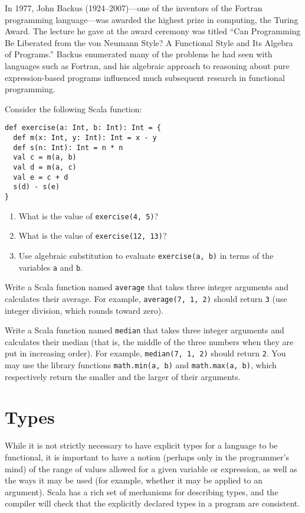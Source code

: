 \begin{tailquote}
In 1977, John Backus (1924--2007)---one of the inventors of the Fortran programming language---was awarded the highest prize in computing, the Turing Award. The lecture he gave at the award ceremony was titled ``Can Programming Be Liberated from the von Neumann Style? A Functional Style and Its Algebra of Programs.'' Backus enumerated many of the problems he had seen with languages such as Fortran, and his algebraic approach to reasoning about pure expression-based programs influenced much subsequent research in functional programming.
\end{tailquote}
\begin{exercises}
\problem Consider the following Scala function:
\begin{verbatim}
def exercise(a: Int, b: Int): Int = {
  def m(x: Int, y: Int): Int = x - y
  def s(n: Int): Int = n * n
  val c = m(a, b)
  val d = m(a, c)
  val e = c + d
  s(d) - s(e)
}
\end{verbatim}
\begin{enumerate}
\item What is the value of \verb|exercise(4, 5)|?
\item What is the value of \verb|exercise(12, 13)|?
\item Use algebraic substitution to evaluate \verb|exercise(a, b)| in terms of the variables \verb|a| and \verb|b|.
\end{enumerate}

\problem Write a Scala function named \verb|average| that takes three integer arguments and calculates their average. For example, \verb|average(7, 1, 2)| should return \verb|3| (use integer division, which rounds toward zero).

\problem Write a Scala function named \verb|median| that takes three integer arguments and calculates their median (that is, the middle of the three numbers when they are put in increasing order). For example, \verb|median(7, 1, 2)| should return \verb|2|. You may use the library functions \verb|math.min(a, b)| and \verb|math.max(a, b)|, which respectively return the smaller and the larger of their arguments.
\end{exercises}

\section{Types}
While it is not strictly necessary to have explicit types for a language to be functional, it is important to have a notion (perhaps only in the programmer's mind) of the range of values allowed for a given variable or expression, as well as the ways it may be used (for example, whether it may be applied to an argument). Scala has a rich set of mechanisms for describing types, and the compiler will check that the explicitly declared types in a program are consistent.


